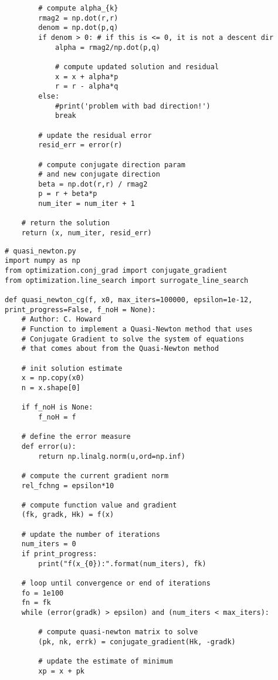 {\begin{verbatim}
        # compute alpha_{k}
        rmag2 = np.dot(r,r)
        denom = np.dot(p,q)
        if denom > 0: # if this is <= 0, it is not a descent dir
            alpha = rmag2/np.dot(p,q)

            # compute updated solution and residual
            x = x + alpha*p
            r = r - alpha*q
        else:
            #print('problem with bad direction!')
            break

        # update the residual error
        resid_err = error(r)

        # compute conjugate direction param
        # and new conjugate direction
        beta = np.dot(r,r) / rmag2
        p = r + beta*p
        num_iter = num_iter + 1

    # return the solution
    return (x, num_iter, resid_err)
\end{verbatim}

\begin{verbatim}
# quasi_newton.py
import numpy as np 
from optimization.conj_grad import conjugate_gradient
from optimization.line_search import surrogate_line_search

def quasi_newton_cg(f, x0, max_iters=100000, epsilon=1e-12, print_progress=False, f_noH = None):
    # Author: C. Howard
    # Function to implement a Quasi-Newton method that uses
    # Conjugate Gradient to solve the system of equations
    # that comes about from the Quasi-Newton method

    # init solution estimate
    x = np.copy(x0)
    n = x.shape[0]

    if f_noH is None:
        f_noH = f

    # define the error measure
    def error(u):
        return np.linalg.norm(u,ord=np.inf)

    # compute the current gradient norm
    rel_fchng = epsilon*10

    # compute function value and gradient
    (fk, gradk, Hk) = f(x)

    # update the number of iterations
    num_iters = 0
    if print_progress:
        print("f(x_{0}):".format(num_iters), fk)

    # loop until convergence or end of iterations
    fo = 1e100
    fn = fk
    while (error(gradk) > epsilon) and (num_iters < max_iters):

        # compute quasi-newton matrix to solve
        (pk, nk, errk) = conjugate_gradient(Hk, -gradk)

        # update the estimate of minimum
        xp = x + pk


\end{verbatim}}
